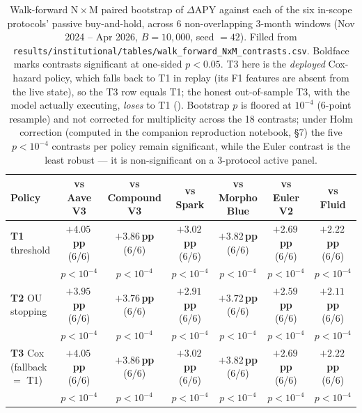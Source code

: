 \begin{table}[t]
  \centering
  \caption{Walk-forward N\,$\times$\,M paired bootstrap of $\Delta$APY
    against each of the six in-scope protocols' passive buy-and-hold,
    across $6$ non-overlapping 3-month windows
    (Nov 2024 -- Apr 2026, $B = 10{,}000$, seed $= 42$).  Filled from
    \texttt{results/institutional/tables/walk\_forward\_NxM\_contrasts.csv}.
    Boldface marks contrasts significant at one-sided $p<0.05$.
    T3 here is the \emph{deployed} Cox-hazard policy, which falls back
    to T1 in replay (its F1 features are absent from the live state), so
    the T3 row equals T1; the honest out-of-sample T3, with the model
    actually executing, \emph{loses} to T1 ().
    Bootstrap $p$ is floored at $10^{-4}$ (6-point resample) and not
    corrected for multiplicity across the 18 contrasts; under Holm
    correction (computed in the companion reproduction notebook, \S 7) the five $p<10^{-4}$ contrasts per policy remain
    significant, while the Euler contrast is the least
    robust --- it is non-significant on a 3-protocol active panel.}
  \label{tab:wf-nxm}
  \footnotesize
  \setlength{\tabcolsep}{4pt}
  \begin{tabular}{lcccccc}
    \toprule
    Policy & vs Aave V3 & vs Compound V3 & vs Spark & vs Morpho Blue & vs Euler V2 & vs Fluid \\
    \midrule
    \textbf{T1} threshold
      & \textbf{$+4.05$\,pp} (6/6)
      & \textbf{$+3.86$\,pp} (6/6)
      & \textbf{$+3.02$\,pp} (6/6)
      & \textbf{$+3.82$\,pp} (6/6)
      & \textbf{$+2.69$\,pp} (6/6)
      & \textbf{$+2.22$\,pp} (6/6) \\
      & $p < 10^{-4}$
      & $p < 10^{-4}$
      & $p < 10^{-4}$
      & $p < 10^{-4}$
      & $p < 10^{-4}$
      & $p < 10^{-4}$ \\
    \midrule
    \textbf{T2} OU stopping
      & \textbf{$+3.95$\,pp} (6/6)
      & \textbf{$+3.76$\,pp} (6/6)
      & \textbf{$+2.91$\,pp} (6/6)
      & \textbf{$+3.72$\,pp} (6/6)
      & \textbf{$+2.59$\,pp} (6/6)
      & \textbf{$+2.11$\,pp} (6/6) \\
      & $p < 10^{-4}$
      & $p < 10^{-4}$
      & $p < 10^{-4}$
      & $p < 10^{-4}$
      & $p < 10^{-4}$
      & $p < 10^{-4}$ \\
    \midrule
    \textbf{T3} Cox (fallback $=$ T1)
      & \textbf{$+4.05$\,pp} (6/6)
      & \textbf{$+3.86$\,pp} (6/6)
      & \textbf{$+3.02$\,pp} (6/6)
      & \textbf{$+3.82$\,pp} (6/6)
      & \textbf{$+2.69$\,pp} (6/6)
      & \textbf{$+2.22$\,pp} (6/6) \\
      & $p < 10^{-4}$
      & $p < 10^{-4}$
      & $p < 10^{-4}$
      & $p < 10^{-4}$
      & $p < 10^{-4}$
      & $p < 10^{-4}$ \\
    \bottomrule
  \end{tabular}
\end{table}

